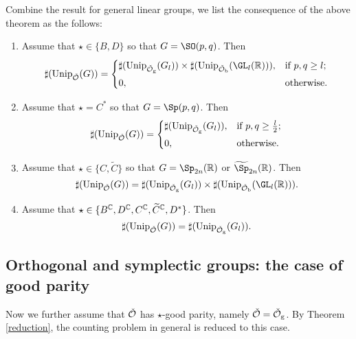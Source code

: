 \documentclass[counting_main.tex]{subfiles}
\begin{document}
 Combine the result for general linear groups, we list the consequence of the
 above theorem as the follows:
 \begin{enumerate}[label=(\alph*)]
   \item Assume that $\star\in \{B,D\}$ so that $G=\SO(p,q)$. Then
         \[
         \sharp(\Unip_{\check \CO}(G))=
         \begin{cases}
           \sharp(\Unip_{\check \CO_{\mathrm g}}(G_l))\times \sharp(\Unip_{\check \CO_{\mathrm b}}(\GL_l(\R)) ), &\hbox{if $p,q\geq l$}; \smallskip\\
           0, &\hbox{otherwise.}
         \end{cases}
         \]
   \item Assume that $\star=C^*$ so that $G=\Sp(p,q)$. Then
         \[
         \sharp(\Unip_{\check \CO}(G))=
         \begin{cases}
           \sharp(\Unip_{\check \CO_{\mathrm g}}(G_l )), &\hbox{if $p,q\geq \frac{l}{2}$}; \smallskip\\
           0, &\hbox{otherwise.}
         \end{cases}
         \]

   \item Assume that $\star\in \{C,\widetilde C\}$ so that $G=\Sp_{2n}(\R)$ or
         $\widetilde \Sp_{2n}(\R)$. Then
         \[
         \sharp(\Unip_{\check \CO}(G))= \sharp(\Unip_{\check \CO_{\mathrm g}}(G_l))\times \sharp(\Unip_{\check \CO_{\mathrm b}}(\GL_l(\R)) ). \]
   \item
         Assume that $\star\in \{B^{\mathbb{C}}, D^{\mathbb{C}}, C^{\mathbb{C}},\widetilde C^{\mathbb{C}}, D^*\}$. Then
         \[
         \sharp(\mathrm{Unip}_{\check {{\mathcal {O}}}}(G))= \sharp(\mathrm{Unip}_{\check {{\mathcal {O}}}_{\mathrm g}}(G_l)).
         \]
 \end{enumerate}


 \subsection{Orthogonal and symplectic groups: the case of good parity}
 Now we further assume that $\check {{\mathcal {O}}}$ has $\star$-good parity, namely
 $\check {{\mathcal {O}}}=\check {{\mathcal {O}}}_{\mathrm g}$. By Theorem \ref{reduction}, the counting
 problem in general is reduced to this case.



\end{document}

